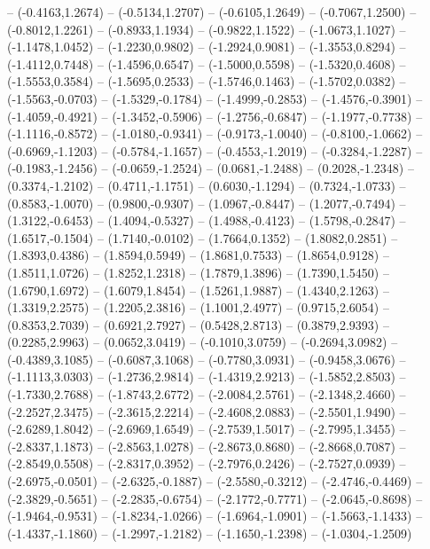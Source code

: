 {	-- (-0.4163,1.2674)
	-- (-0.5134,1.2707)
	-- (-0.6105,1.2649)
	-- (-0.7067,1.2500)
	-- (-0.8012,1.2261)
	-- (-0.8933,1.1934)
	-- (-0.9822,1.1522)
	-- (-1.0673,1.1027)
	-- (-1.1478,1.0452)
	-- (-1.2230,0.9802)
	-- (-1.2924,0.9081)
	-- (-1.3553,0.8294)
	-- (-1.4112,0.7448)
	-- (-1.4596,0.6547)
	-- (-1.5000,0.5598)
	-- (-1.5320,0.4608)
	-- (-1.5553,0.3584)
	-- (-1.5695,0.2533)
	-- (-1.5746,0.1463)
	-- (-1.5702,0.0382)
	-- (-1.5563,-0.0703)
	-- (-1.5329,-0.1784)
	-- (-1.4999,-0.2853)
	-- (-1.4576,-0.3901)
	-- (-1.4059,-0.4921)
	-- (-1.3452,-0.5906)
	-- (-1.2756,-0.6847)
	-- (-1.1977,-0.7738)
	-- (-1.1116,-0.8572)
	-- (-1.0180,-0.9341)
	-- (-0.9173,-1.0040)
	-- (-0.8100,-1.0662)
	-- (-0.6969,-1.1203)
	-- (-0.5784,-1.1657)
	-- (-0.4553,-1.2019)
	-- (-0.3284,-1.2287)
	-- (-0.1983,-1.2456)
	-- (-0.0659,-1.2524)
	-- (0.0681,-1.2488)
	-- (0.2028,-1.2348)
	-- (0.3374,-1.2102)
	-- (0.4711,-1.1751)
	-- (0.6030,-1.1294)
	-- (0.7324,-1.0733)
	-- (0.8583,-1.0070)
	-- (0.9800,-0.9307)
	-- (1.0967,-0.8447)
	-- (1.2077,-0.7494)
	-- (1.3122,-0.6453)
	-- (1.4094,-0.5327)
	-- (1.4988,-0.4123)
	-- (1.5798,-0.2847)
	-- (1.6517,-0.1504)
	-- (1.7140,-0.0102)
	-- (1.7664,0.1352)
	-- (1.8082,0.2851)
	-- (1.8393,0.4386)
	-- (1.8594,0.5949)
	-- (1.8681,0.7533)
	-- (1.8654,0.9128)
	-- (1.8511,1.0726)
	-- (1.8252,1.2318)
	-- (1.7879,1.3896)
	-- (1.7390,1.5450)
	-- (1.6790,1.6972)
	-- (1.6079,1.8454)
	-- (1.5261,1.9887)
	-- (1.4340,2.1263)
	-- (1.3319,2.2575)
	-- (1.2205,2.3816)
	-- (1.1001,2.4977)
	-- (0.9715,2.6054)
	-- (0.8353,2.7039)
	-- (0.6921,2.7927)
	-- (0.5428,2.8713)
	-- (0.3879,2.9393)
	-- (0.2285,2.9963)
	-- (0.0652,3.0419)
	-- (-0.1010,3.0759)
	-- (-0.2694,3.0982)
	-- (-0.4389,3.1085)
	-- (-0.6087,3.1068)
	-- (-0.7780,3.0931)
	-- (-0.9458,3.0676)
	-- (-1.1113,3.0303)
	-- (-1.2736,2.9814)
	-- (-1.4319,2.9213)
	-- (-1.5852,2.8503)
	-- (-1.7330,2.7688)
	-- (-1.8743,2.6772)
	-- (-2.0084,2.5761)
	-- (-2.1348,2.4660)
	-- (-2.2527,2.3475)
	-- (-2.3615,2.2214)
	-- (-2.4608,2.0883)
	-- (-2.5501,1.9490)
	-- (-2.6289,1.8042)
	-- (-2.6969,1.6549)
	-- (-2.7539,1.5017)
	-- (-2.7995,1.3455)
	-- (-2.8337,1.1873)
	-- (-2.8563,1.0278)
	-- (-2.8673,0.8680)
	-- (-2.8668,0.7087)
	-- (-2.8549,0.5508)
	-- (-2.8317,0.3952)
	-- (-2.7976,0.2426)
	-- (-2.7527,0.0939)
	-- (-2.6975,-0.0501)
	-- (-2.6325,-0.1887)
	-- (-2.5580,-0.3212)
	-- (-2.4746,-0.4469)
	-- (-2.3829,-0.5651)
	-- (-2.2835,-0.6754)
	-- (-2.1772,-0.7771)
	-- (-2.0645,-0.8698)
	-- (-1.9464,-0.9531)
	-- (-1.8234,-1.0266)
	-- (-1.6964,-1.0901)
	-- (-1.5663,-1.1433)
	-- (-1.4337,-1.1860)
	-- (-1.2997,-1.2182)
	-- (-1.1650,-1.2398)
	-- (-1.0304,-1.2509)
}
